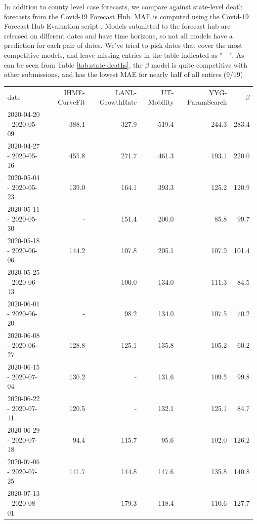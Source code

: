 \documentclass[nobib]{tufte-handout}
\newcommand{\bAR}{\ensuremath{\beta}\text{-AR}\xspace}
\begin{document}
In addition to county level case forecasts, we compare against state-level death forecasts from the Covid-19 Forecast Hub.  
MAE is computed using the Covid-19 Forecast Hub Evaluation script .
Models submitted to the forecast hub are released on different dates and have time horizons, so not all models have a prediction for each pair of dates.  
We've tried to pick dates that cover the most competitive models, and leave missing entries in the table indicated as " - ".  As can be seen from Table \ref{tab:state-deaths},
the \bAR model is quite competitive with other submissions, and has the lowest MAE for nearly half of all entires (9/19).

\begin{table}
\centering
\begin{tabular}{lrrrrr}
\toprule
date & IHME-CurveFit & LANL-GrowthRate & UT-Mobility & YYG-ParamSearch & \bAR \\
2020-04-20 - 2020-05-09 & 388.1 & 327.9 & 519.4 & \cellcolor{red} 244.3 & 283.4 \\
2020-04-27 - 2020-05-16 & 455.8 & 271.7 & 461.3 & \cellcolor{red} 193.1 & 220.0 \\
2020-05-04 - 2020-05-23 & 139.0 & 164.1 & 393.3 & 125.2 & \cellcolor{red} 120.9 \\
2020-05-11 - 2020-05-30 &  -  & 151.4 & 200.0 & \cellcolor{red} 85.8 & 99.7 \\
2020-05-18 - 2020-06-06 & 144.2 & 107.8 & 205.1 & 107.9 & \cellcolor{red} 101.4 \\
2020-05-25 - 2020-06-13 &  -  & 100.0 & 134.0 & 111.3 & \cellcolor{red} 84.5 \\
2020-06-01 - 2020-06-20 &  -  & 98.2 & 134.0 & 107.5 & \cellcolor{red} 70.2 \\
2020-06-08 - 2020-06-27 & 128.8 & 125.1 & 135.8 & 105.2 & \cellcolor{red} 60.2 \\
2020-06-15 - 2020-07-04 & 130.2 &  -  & 131.6 & 109.5 & \cellcolor{red} 99.8 \\
2020-06-22 - 2020-07-11 & 120.5 &  -  & 132.1 & 125.1 & \cellcolor{red} 84.7 \\
2020-06-29 - 2020-07-18 & \cellcolor{red} 94.4 & 115.7 & 95.6 & 102.0 & 126.2 \\
2020-07-06 - 2020-07-25 & 141.7 & 144.8 & 147.6 & \cellcolor{red} 135.8 & 140.8 \\
2020-07-13 - 2020-08-01 &  -  & 179.3 & 118.4 & \cellcolor{red} 110.6 & 127.7 \\

\end{tabular}
\end{table}
\end{document}

